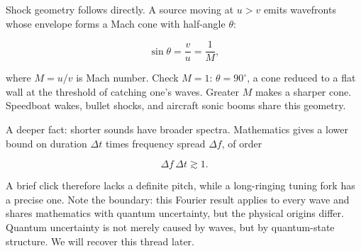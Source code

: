 \begin{challenge}
Shock geometry follows directly. A source moving at \(u>v\) emits wavefronts whose envelope forms a Mach cone with half-angle \(\theta\):

\[
  \sin\theta = \frac{v}{u} = \frac{1}{M},
\]

where \(M=u/v\) is Mach number. Check \(M=1\): \(\theta=90^\circ\), a cone reduced to a flat wall at the threshold of catching one's waves. Greater \(M\) makes a sharper cone. Speedboat wakes, bullet shocks, and aircraft sonic booms share this geometry.

A deeper fact: shorter sounds have broader spectra. Mathematics gives a lower bound on duration \(\Delta t\) times frequency spread \(\Delta f\), of order

\[
  \Delta f\,\Delta t \gtrsim 1 .
\]

A brief click therefore lacks a definite pitch, while a long-ringing tuning fork has a precise one. Note the boundary: this Fourier result applies to every wave and shares mathematics with quantum uncertainty, but the physical origins differ. Quantum uncertainty is not merely caused by waves, but by quantum-state structure. We will recover this thread later.
\end{challenge}


